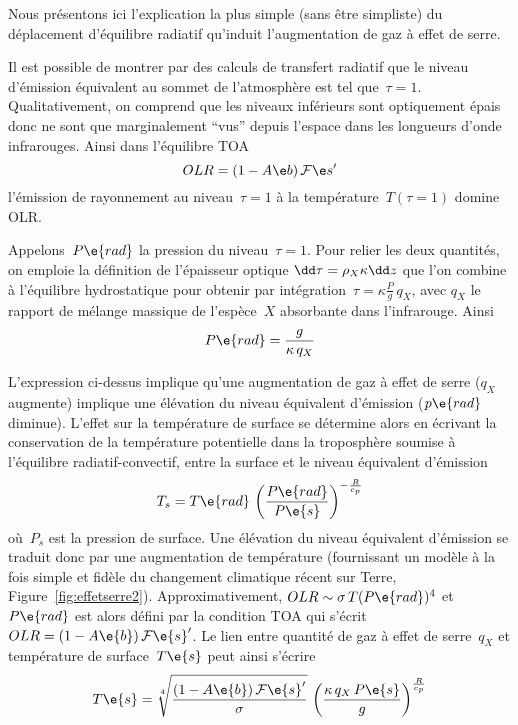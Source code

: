 



\sk
Nous présentons ici l'explication la plus simple (sans être simpliste) du déplacement
d'équilibre radiatif qu'induit l'augmentation de gaz à effet de serre.

\sk
Il est possible de montrer par des calculs de transfert radiatif que le niveau
d'émission équivalent au sommet de l'atmosphère est tel que~$\tau = 1$.
Qualitativement, on comprend que les niveaux inférieurs sont optiquement
épais donc ne sont que marginalement ``vus'' depuis l'espace dans les longueurs d'onde infrarouges.
Ainsi dans l'équilibre TOA
\[ \TOA \] 
\noindent l'émission de rayonnement au niveau~$\tau=1$ 
à la température~$T(\tau=1)$ domine OLR.

\sk
Appelons~$P\e{rad}$ la pression du niveau~$\tau=1$. 
Pour relier
les deux quantités, on emploie la définition de l'épaisseur optique
$\EO$ que l'on combine
à l'équilibre hydrostatique pour obtenir
par intégration~$\tau = \kappa \frac{P}{g} \, q_X$,
avec $q_X$ le rapport de mélange massique 
de l'espèce~$X$ absorbante dans l'infrarouge.
Ainsi
\[ P\e{rad} = \frac{g}{\kappa \, q_X} \]


\sk
L'expression ci-dessus implique qu'une augmentation de
gaz à effet de serre ($q_X$ augmente) implique une 
élévation du niveau équivalent d'émission
($p\e{rad}$ diminue).
L'effet sur la température de surface se détermine alors
en écrivant la conservation de la température potentielle
dans la troposphère soumise à l'équilibre radiatif-convectif,
entre la surface et le niveau équivalent d'émission
\[ T_s = T\e{rad} \, \left( \frac{P\e{rad}}{P\e{s}} \right)^{-\frac{R}{c_p}} \]
\noindent où~$P_s$ est la pression de surface.
Une élévation du niveau équivalent d'émission
se traduit donc par une augmentation
de température (fournissant
un modèle à la fois simple et fidèle du 
changement climatique récent sur Terre, Figure~\ref{fig:effetserre2}). 
Approximativement, $OLR \sim \sigma \, T(P\e{rad})^4$
et~$P\e{rad}$ est alors défini par la 
condition TOA qui s'écrit~$OLR = (1-A\e{b}) \, \mathcal{F}\e{s}'$.
Le lien entre quantité de gaz à effet de serre~$q_X$
et température de surface~$T\e{s}$ peut ainsi s'écrire
\[ T\e{s} = \sqrt[4]{\frac{(1-A\e{b}) \, \mathcal{F}\e{s}'}{\sigma}} \, \left( \frac{\kappa \, q_X \,P\e{s}}{g} \right)^{\frac{R}{c_p}} \]
